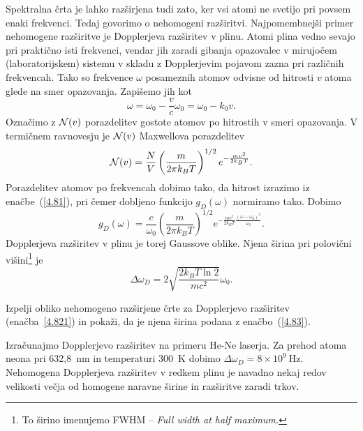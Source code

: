 Spektralna črta je lahko razširjena tudi zato, ker vsi atomi ne svetijo
pri povsem enaki frekvenci. Tedaj govorimo o nehomogeni 
razširitvi.
Najpomembnejši primer nehomogene razširitve je Dopplerjeva 
 razširitev v plinu. 
Atomi plina vedno sevajo pri praktično isti frekvenci, vendar jih zaradi gibanja
opazovalec v mirujočem (laboratorijskem) sistemu v skladu z Dopplerjevim pojavom 
zazna pri različnih frekvencah. Tako so frekvence $\omega$ posameznih atomov 
odvisne od hitrosti $v$ atoma glede na smer opazovanja. Zapišemo jih kot  
\begin{equation}
\omega=\omega_{0}-\frac{v}{c}\omega_{0}=\omega_{0}-k_{0}v.
\label{4.81}
\end{equation}
Označimo z ${\cal N}(v)$ porazdelitev gostote atomov po hitrostih
v smeri opazovanja. V termičnem ravnovesju je ${\cal N}(v)$ Maxwellova
porazdelitev
\begin{equation}
{\cal N}(v)=\frac{N}{V}\left(\frac{m}{2\pi k_{B}T}\right)^{1/2}e^{-\frac{mv^{2}}{2k_{B}T}}.
\label{4.82}
\end{equation}
 Porazdelitev atomov po frekvencah dobimo tako, da hitrost izrazimo
iz enačbe~(\ref{4.81}), pri čemer dobljeno funkcijo $g_{D}(\omega)$
normiramo tako. Dobimo
\begin{equation}
g_{D}(\omega)=\frac{c}{\omega_{0}}\left(\frac{m}{2\pi 
k_{B}T}\right)^{1/2}e^{-\frac{mc^{2}}{2k_{B}T}\frac{(\omega-\omega_{0})^{2}}{\omega_{0}}}.
\label{4.821}
\end{equation}
Dopplerjeva razširitev v plinu je torej Gaussove oblike. Njena širina pri polovični 
višini\footnote{To širino imenujemo FWHM -- \it{Full width at half maximum}.} je
\begin{equation}
\Delta\omega_{D}=2 \sqrt{\frac{2k_{B}T \ln 2}{mc^{2}}}\omega_{0}.
\label{4.83}
\end{equation}
\begin{definition}
Izpelji obliko nehomogeno razširjene črte za Dopplerjevo razširitev (enačba~\ref{4.821})
in pokaži, da je njena širina podana z enačbo~(\ref{4.83}).
\end{definition}

Izračunajmo Dopplerjevo razširitev na primeru He-Ne laserja. Za prehod
atoma neona pri 632,8~nm in temperaturi 300~K dobimo 
$\Delta\omega_{D}=8\times10^{9}~\si{\hertz}$. Nehomogena Dopplerjeva razširitev v 
redkem plinu je navadno nekaj redov velikosti večja od homogene naravne širine in 
razširitve zaradi trkov.

